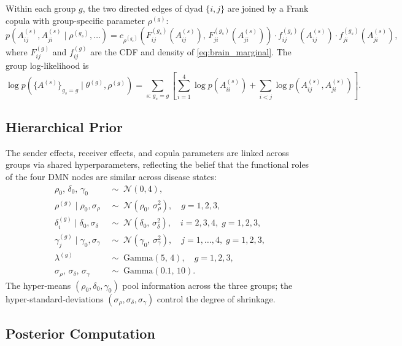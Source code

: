 \documentclass[12pt]{article}
\begin{document}
Within each group $g$, the two directed edges of dyad $\{i,j\}$ are
joined by a Frank copula with group-specific parameter $\rho^{(g)}$:
\[
p(A^{(s)}_{ij}, A^{(s)}_{ji} \mid \rho^{(g_s)}, \ldots)
  = c_{\rho^{(g_s)}}\!\left(F^{(g_s)}_{ij}(A^{(s)}_{ij}),\,
    F^{(g_s)}_{ji}(A^{(s)}_{ji})\right)
    \cdot f^{(g_s)}_{ij}(A^{(s)}_{ij}) \cdot f^{(g_s)}_{ji}(A^{(s)}_{ji}),
\]
where $F^{(g)}_{ij}$ and $f^{(g)}_{ij}$ are the CDF and density of
\eqref{eq:brain_marginal}.  The group log-likelihood is
\begin{equation}
\label{eq:brain_loglik}
\log p(\{A^{(s)}\}_{g_s=g} \mid \theta^{(g)}, \rho^{(g)})
  = \sum_{s:\,g_s=g}\!\left[
      \sum_{i=1}^4 \log p(A^{(s)}_{ii})
      + \sum_{i < j} \log p(A^{(s)}_{ij}, A^{(s)}_{ji})
    \right].
\end{equation}

\subsection{Hierarchical Prior}

The sender effects, receiver effects, and copula parameters are linked
across groups via shared hyperparameters, reflecting the belief that the
functional roles of the four DMN nodes are similar across disease states:
\begin{align}
\rho_0,\, \delta_0,\, \gamma_0 &\;\sim\; \mathcal{N}(0, 4),
  \label{eq:hyperprior} \\
\rho^{(g)} \mid \rho_0, \sigma_\rho
  &\;\sim\; \mathcal{N}(\rho_0,\, \sigma_\rho^2),
  \quad g = 1,2,3, \\
\delta_i^{(g)} \mid \delta_0, \sigma_\delta
  &\;\sim\; \mathcal{N}(\delta_0,\, \sigma_\delta^2),
  \quad i = 2,3,4,\; g = 1,2,3, \\
\gamma_j^{(g)} \mid \gamma_0, \sigma_\gamma
  &\;\sim\; \mathcal{N}(\gamma_0,\, \sigma_\gamma^2),
  \quad j = 1,\ldots,4,\; g = 1,2,3, \\
\lambda^{(g)} &\;\sim\; \mathrm{Gamma}(5,\, 4),
  \quad g = 1,2,3, \\
\sigma_\rho,\, \sigma_\delta,\, \sigma_\gamma
  &\;\sim\; \mathrm{Gamma}(0.1,\, 10).
  \label{eq:hyperprior_end}
\end{align}
The hyper-means $(\rho_0, \delta_0, \gamma_0)$ pool information across the
three groups; the hyper-standard-deviations $(\sigma_\rho, \sigma_\delta,
\sigma_\gamma)$ control the degree of shrinkage.

\subsection{Posterior Computation}
\end{document}
